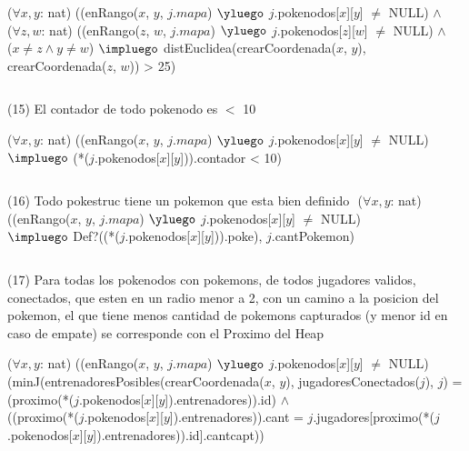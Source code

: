 \begin{Representacion}
($\forall x, y$: nat) ((enRango($x$, $y$, $j.mapa$) $\yluego$ $j$.pokenodos[$x$][$y$] $\neq$ NULL) $ \land$\\
($\forall z, w$: nat) ((enRango($z$, $w$, $j.mapa$) $\yluego$ $j$.pokenodos[$z$][$w$] $\neq$ NULL) $\land$ \\
($x \neq z \land y \neq w$) $\impluego$  distEuclidea(crearCoordenada($x$, $y$), crearCoordenada($z$, $w$)) > 25)

$ $\newline

(15) El contador de todo pokenodo es $<$ 10 $ $\newline

($\forall x, y$: nat) ((enRango($x$, $y$, $j.mapa$) $\yluego$ $j$.pokenodos[$x$][$y$] $\neq$ NULL) \\
	$\impluego$ (*($j$.pokenodos[$x$][$y$])).contador < 10)

$ $\newline

(16) Todo pokestruc tiene un pokemon que esta bien definido $ $\newline
($\forall x, y$: nat) ((enRango($x$, $y$, $j.mapa$) $\yluego$ $j$.pokenodos[$x$][$y$] $\neq$ NULL) \\
	$\impluego$ Def?((*($j$.pokenodos[$x$][$y$])).poke), $j$.cantPokemon)

$ $\newline


(17) Para todas los pokenodos con pokemons, de todos jugadores validos, conectados, que esten en un radio menor a 2, con un camino a la posicion del pokemon, el que tiene menos cantidad de pokemons capturados (y menor id en caso de empate) se corresponde con el Proximo del Heap $ $\newline

($\forall x, y$: nat) ((enRango($x$, $y$, $j.mapa$) $\yluego$ $j$.pokenodos[$x$][$y$] $\neq$ NULL) \\
	(minJ(entrenadoresPosibles(crearCoordenada($x$, $y$), jugadoresConectados($j$), $j$) = \\
	(proximo(*($j$.pokenodos[$x$][$y$]).entrenadores)).id) $\land$ \\
	((proximo(*($j$.pokenodos[$x$][$y$]).entrenadores)).cant = $j$.jugadores[proximo(*($j$.pokenodos[$x$][$y$]).entrenadores)).id].cantcapt))
	

\end{Representacion}
